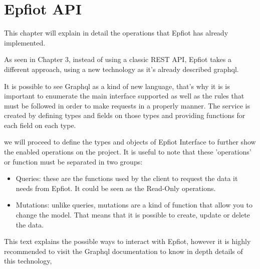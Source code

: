 
\cleardoublepage


\chapter{Epfiot API}
\label{makereference5}

This chapter will explain in detail the operations that Epfiot has already implemented.

As seen in Chapter 3, instead of using a classic REST API, Epfiot takes a different approach, using a new technology as it's already described graphql.

It is possible to see Graphql as a kind of new language, that's why it is is important to enumerate the main interface supported as well as the rules that must be followed in order to make requests in a properly manner. The service is created by defining types and fields on those types and providing functions for each field on each type.

we will proceed to define the types and objects of Epfiot Interface to further show the enabled operations on the project. It is useful to note that these 'operations' or function must be separated in two groups:
\begin{itemize}
    \item Queries: these are the functions used by the client to request the data it needs from Epfiot. It could be seen as the Read-Only operations.
    \item Mutations: unlike queries, mutations are a kind of function that allow you to change the model. That means that it is possible to create, update or delete the data.
\end{itemize}

This text explains the possible ways to interact with Epfiot, however it is highly recommended to visit the Graphql documentation to know in depth details of this technology, 
\newpage


